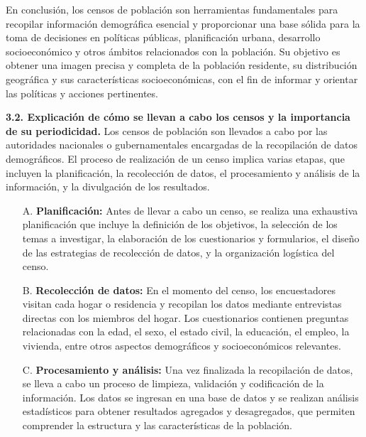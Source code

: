 \documentclass[8pt,a4paper]{beamer}
\begin{document}
{\begin{frame}{}
\begin{block}{}
\justifying
En conclusión, los censos de población son herramientas fundamentales para recopilar información demográfica esencial y proporcionar una base sólida para la toma de decisiones en políticas públicas, planificación urbana, desarrollo socioeconómico y otros ámbitos relacionados con la población. Su objetivo es obtener una imagen precisa y completa de la población residente, su distribución geográfica y sus características socioeconómicas, con el fin de informar y orientar las políticas y acciones pertinentes.
\end{block}
\end{frame}

\begin{frame}{}
\begin{block}{\textbf{3.2. Explicación de cómo se llevan a cabo los censos y la importancia de su periodicidad.}}
\justifying
Los censos de población son llevados a cabo por las autoridades nacionales o gubernamentales encargadas de la recopilación de datos demográficos. El proceso de realización de un censo implica varias etapas, que incluyen la planificación, la recolección de datos, el procesamiento y análisis de la información, y la divulgación de los resultados.
\begin{enumerate}
\justifying
\item[A.] \textbf{Planificación:} Antes de llevar a cabo un censo, se realiza una exhaustiva planificación que incluye la definición de los objetivos, la selección de los temas a investigar, la elaboración de los cuestionarios y formularios, el diseño de las estrategias de recolección de datos, y la organización logística del censo.

\item[B.] \textbf{Recolección de datos:} En el momento del censo, los encuestadores visitan cada hogar o residencia y recopilan los datos mediante entrevistas directas con los miembros del hogar. Los cuestionarios contienen preguntas relacionadas con la edad, el sexo, el estado civil, la educación, el empleo, la vivienda, entre otros aspectos demográficos y socioeconómicos relevantes.

\end{enumerate}
\end{block}
\end{frame}

\begin{frame}{}
\begin{block}{}
\justifying
\begin{enumerate}
\justifying
\item[C.] \textbf{Procesamiento y análisis:} Una vez finalizada la recopilación de datos, se lleva a cabo un proceso de limpieza, validación y codificación de la información. Los datos se ingresan en una base de datos y se realizan análisis estadísticos para obtener resultados agregados y desagregados, que permiten comprender la estructura y las características de la población.


\end{enumerate}
\end{block}
\end{frame}}
\end{document}
